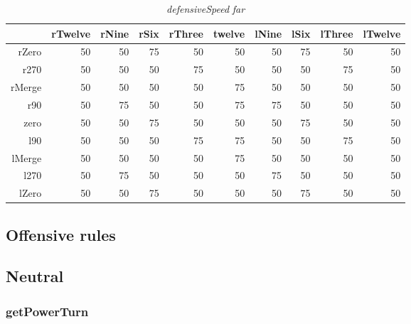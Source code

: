 \begin{table}[H]
\centering
\caption{\emph{defensiveSpeed} \emph{far}}
\label{Turn rule table}
\begin{tabular}{r|r|r|r|r|r|r|r|r|r}
 		& rTwelve 	& rNine 	& rSix 		& rThree 		& twelve 	& lNine 	& lSix 		& lThree	& lTwelve		\\ \hline
rZero	& 50		& 50		& 75		& 50 		 	& 50		& 50		& 75 		& 50		& 50			\\
r270	& 50		& 50		& 50		& 75			& 50		& 50		& 50		& 75		& 50			\\
rMerge	& 50		& 50		& 50	 	& 50			& 75		& 50		& 50		& 50		& 50			\\
r90		& 50		& 75		& 50 		& 50			& 75		& 75		& 50		& 50		& 50			\\
zero 	& 50		& 50 		& 75 		& 50			& 50		& 50		& 75		& 50		& 50			\\
l90 	& 50		& 50 		& 50		& 75			& 75		& 50		& 50		& 75		& 50			\\
lMerge	& 50		& 50 		& 50	 	& 50			& 75		& 50		& 50		& 50		& 50			\\
l270 	& 50		& 75	 	& 50 		& 50			& 50		& 75		& 50		& 50		& 50			\\
lZero 	& 50		& 50 		& 75	 	& 50			& 50		& 50  		& 75		& 50		& 50			\\
\end{tabular}
\end{table}

\subsection{Offensive rules}

\subsection{Neutral}

\subsubsection{getPowerTurn}

